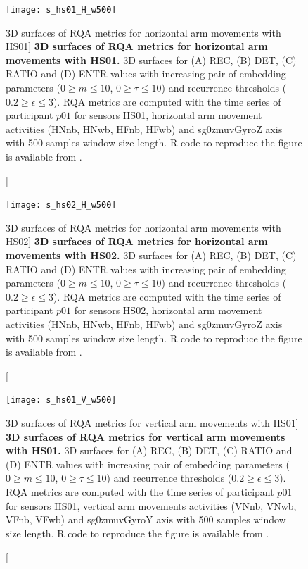 \begin{figure}
\centering
\texttt{[image: s\_hs01\_H\_w500]}
    \caption
	[3D surfaces of RQA metrics for horizontal arm movements with HS01]{
	{\bf 3D surfaces of RQA metrics for horizontal arm movements with HS01.}
	3D surfaces for (A) REC, (B) DET, (C) RATIO and (D) ENTR values 
	with increasing pair of embedding parameters 
	($0 \ge m \le 10$, $0 \ge \tau \le 10$) 
	and recurrence thresholds ($ 0.2 \ge \epsilon \le 3 $).
	RQA metrics are computed with the time series of participant $p01$ 
	for sensors HS01, horizontal arm movement activities 
	(HNnb, HNwb, HFnb, HFwb) and 
	sg0zmuvGyroZ axis with 500 samples window size length. 
        R code to reproduce the figure is available from \cite{hwum2018}.
	}
\label{fig:topo_s_hs01_H_w500}
\end{figure}

\begin{figure}
\centering
\texttt{[image: s\_hs02\_H\_w500]}
    \caption
	[3D surfaces of RQA metrics for horizontal arm movements with HS02]{
	{\bf 3D surfaces of RQA metrics for horizontal arm movements with HS02.}
	3D surfaces for (A) REC, (B) DET, (C) RATIO and (D) ENTR values 
	with increasing pair of embedding parameters 
	($0 \ge m \le 10$, $0 \ge \tau \le 10$) 
	and recurrence thresholds ($ 0.2 \ge \epsilon \le 3 $).
	RQA metrics are computed with the time series of participant $p01$ 
	for sensors HS02, horizontal arm movement activities 
	(HNnb, HNwb, HFnb, HFwb) and 
	sg0zmuvGyroZ axis with 500 samples window size length. 
        R code to reproduce the figure is available from \cite{hwum2018}.
	}
\label{fig:topo_s_hs02_H_w500}
\end{figure}

\begin{figure}
\centering
\texttt{[image: s\_hs01\_V\_w500]}
    \caption
	[3D surfaces of RQA metrics for vertical arm movements with HS01]{
	{\bf 3D surfaces of RQA metrics for vertical arm movements with HS01.}
	3D surfaces for (A) REC, (B) DET, (C) RATIO and (D) ENTR values 
	with increasing pair of embedding parameters 
	($0 \ge m \le 10$, $0 \ge \tau \le 10$) 
	and recurrence thresholds ($ 0.2 \ge \epsilon \le 3 $).
	RQA metrics are computed with the time series of participant $p01$ 
	for sensors HS01, vertical arm movements activities 
	(VNnb, VNwb, VFnb, VFwb) and 
	sg0zmuvGyroY axis with 500 samples window size length. 
        R code to reproduce the figure is available from \cite{hwum2018}.
	}
\label{fig:topo_s_hs01_V_w500}
\end{figure}


